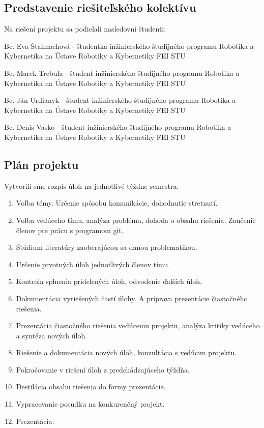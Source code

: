 \documentclass[../main.tex]{subfiles}
\begin{document}
    \subsection{Predstavenie riešiteľského kolektívu}   
    Na riešení projektu sa podieľali nasledovní študenti:

        Bc. Eva Štalmachová - študentka inžinierského študijného programu Robotika a Kybernetika na Ústave Robotiky a Kybernetiky FEI STU

        Bc. Marek Trebuľa - študent inžinierského študijného programu Robotika a Kybernetika na Ústave Robotiky a Kybernetiky FEI STU

        Bc. Ján Urdianyk - študent inžinierského študijného programu Robotika a Kybernetika na Ústave Robotiky a Kybernetiky FEI STU

        Bc. Denis Vasko - študent inžinierského študijného programu Robotika a Kybernetika na Ústave Robotiky a Kybernetiky FEI STU

    \subsection{Plán projektu}   
    Vytvorili sme rozpis úloh na jednotlivé týždne semestra:
    \begin{enumerate}
    	\item Voľba témy. Určenie spôsobu komunikácie, dohodnutie stretnutí. 
    	\item Voľba vedúceho tímu, analýza problému, dohoda o obsahu riešenia. Zaučenie členov pre prácu s programom git. 
    	\item Štúdium literatúry zaoberajúcou sa danou problematikou.
    	\item Určenie prvotných úloh jednotlivých členov tímu.
    	\item Kontrola splnenia pridelených úloh, odvodenie ďalších úloh.
    	\item Dokumentácia vyriešených častí úlohy. A príprava prezentácie čiastočného riešenia.
    	\item Prezentácia čiastočného riešenia vedúcemu projektu, analýza kritiky vedúceho a syntéza nových úloh. 
    	\item Riešenie a dokumentácia nových úloh, konzultácia s vedúcim projektu.
    	\item Pokračovanie v riešení úloh z predchádzajúceho týždňa.
    	\item Destilácia obsahu riešenia do formy prezentácie.
    	\item Vypracovanie posudku na konkurenčný projekt.
    	\item Prezentácia.
    \end{enumerate}
\end{document}
